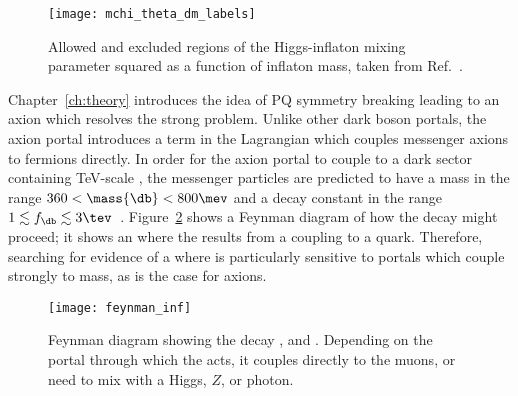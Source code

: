 

\begin{figure}
  \begin{center}
    \texttt{[image: mchi\_theta\_dm\_labels]}
    \caption[Parameter space for a model including an inflaton]
    {
      Allowed and excluded regions of the Higgs-inflaton mixing parameter squared as a function of
      inflaton mass, taken from Ref.~\protect\cite{Bezrukov:2014nza}.
    }
    \label{fig:db:inflaton}
  \end{center}
\end{figure}




Chapter~\ref{ch:theory} introduces the idea of \gls{PQ} symmetry breaking leading to an axion
which resolves the strong \CP problem.
Unlike other dark boson portals, the axion portal introduces a term in the Lagrangian which couples
messenger axions to fermions directly.
In order for the axion portal to couple to a dark sector containing TeV-scale \dm, the messenger
particles are predicted to have a mass in the range $360<\mass{\db}<800\mev$ and a decay
constant in the range $1\lesssim f_\db\lesssim3\tev$~\cite{Nomura:2008ru}.
Figure~\ref{fig:db:feynman} shows a Feynman diagram of how the decay \btokstrdb might proceed;
it shows an \fcnc where the \db results from a coupling to a \tquark quark.
Therefore, searching for evidence of a \btokstrdb where \dbtomumu is particularly sensitive to
portals which couple strongly to mass, as is the case for axions.

\begin{figure}
  \begin{center}
    \texttt{[image: feynman\_inf]}
    \caption[Feynman diagram for the decay \btokstrdb]
    {
      Feynman diagram showing the decay \btokstrdb, and \dbtomumu.
      Depending on the portal through which the \db acts, it couples directly to the muons, or need
      to mix with a \sm Higgs, $Z$, or photon.
    }
    \label{fig:db:feynman}
  \end{center}
\end{figure}

